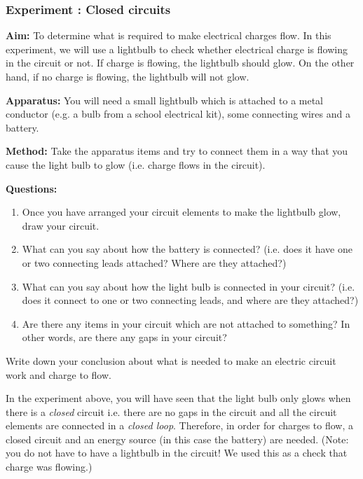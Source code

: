             \subsubsection{ Experiment : Closed circuits }
            \nopagebreak
            \label{m38771*id62648}\noindent{}\textbf{Aim:}
To determine what is required to make electrical charges flow.
In this experiment, we will use a lightbulb to check whether electrical charge is flowing in the circuit or not. If charge is flowing, the lightbulb should glow. On the other hand, if no charge is flowing, the lightbulb will not glow.\par 
        \label{m38771*id62665}\noindent{}\textbf{Apparatus:}
        You will need a small lightbulb which is attached to a metal conductor (e.g. a bulb from a school electrical kit), some connecting wires and a battery.\par 
        \label{m38771*id62679}\noindent{}\textbf{Method:}
        Take the apparatus items and try to connect them in a way that you cause the light bulb to glow (i.e. charge flows in the circuit).\par 
        \label{m38771*id62694}\noindent{}\textbf{Questions:}
        \label{m38771*id62702}\begin{enumerate}[noitemsep, label=\textbf{\arabic*}. ] 
            \label{m38771*uid6}\item Once you have arranged your circuit elements to make the lightbulb glow, draw your circuit.
\label{m38771*uid7}\item What can you say about how the battery is connected? (i.e. does it have one or two connecting leads attached? Where are they attached?)
\label{m38771*uid8}\item What can you say about how the light bulb is connected in your circuit? (i.e. does it connect to one or two connecting leads, and where are they attached?)
\label{m38771*uid9}\item Are there any items in your circuit which are not attached to something? In other words, are there any gaps in your circuit?
\end{enumerate}
        \par 
        \label{m38771*id62757}Write down your conclusion about what is needed to make an electric circuit work and charge to flow.
 \par 
        \label{m38771*id62768}In the experiment above, you will have seen that the light bulb only glows when there is a \textsl{closed} circuit i.e. there are no gaps in the circuit and all the circuit elements are connected in a \textsl{closed loop}. Therefore, in order for charges to flow, a closed circuit and an energy source (in this case the battery) are needed. (Note: you do not have to have a lightbulb in the circuit! We used this as a check that charge was flowing.)\par 
